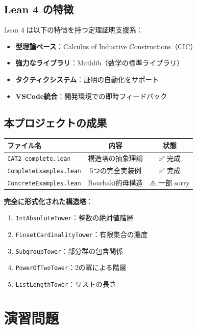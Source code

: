 \documentclass[a4paper,11pt]{ltjsarticle}
\begin{document}
\subsection{Lean 4 の特徴}

Lean 4 は以下の特徴を持つ定理証明支援系：
\begin{itemize}
\item \textbf{型理論ベース}：Calculus of Inductive Constructions（CIC）
\item \textbf{強力なライブラリ}：Mathlib（数学の標準ライブラリ）
\item \textbf{タクティクシステム}：証明の自動化をサポート
\item \textbf{VSCode統合}：開発環境での即時フィードバック
\end{itemize}

\subsection{本プロジェクトの成果}

\begin{center}
\begin{tabular}{|l|c|c|}
\hline
\textbf{ファイル名} & \textbf{内容} & \textbf{状態} \\
\hline
\texttt{CAT2\_complete.lean} & 構造塔の抽象理論 & ✅ 完成 \\
\texttt{CompleteExamples.lean} & 5つの完全実装例 & ✅ 完成 \\
\texttt{ConcreteExamples.lean} & Bourbaki的母構造 & ⚠️ 一部 sorry \\
\hline
\end{tabular}
\end{center}

\textbf{完全に形式化された構造塔}：
\begin{enumerate}
\item \texttt{IntAbsoluteTower}：整数の絶対値階層
\item \texttt{FinsetCardinalityTower}：有限集合の濃度
\item \texttt{SubgroupTower}：部分群の包含関係
\item \texttt{PowerOfTwoTower}：2の冪による階層
\item \texttt{ListLengthTower}：リストの長さ
\end{enumerate}

\newpage

\section{演習問題}
\end{document}
